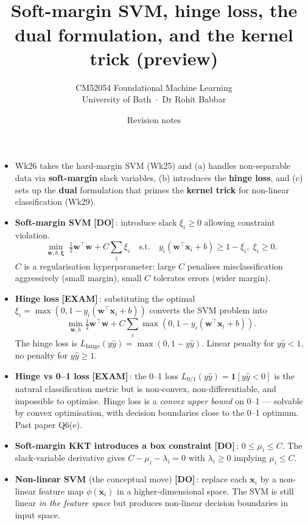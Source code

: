 \documentclass[11pt, a4paper]{article}
\title{\vspace{-1cm}{\Huge\bfseries Week 26 — Non-linear Support Vector Machines} \\[0.4em]{\large Soft-margin SVM, hinge loss, the dual formulation, and the kernel trick (preview)}}
\author{\large CM52054 Foundational Machine Learning \\[0.2em]\normalsize University of Bath \,$\cdot$\, Dr Rohit Babbar}
\date{Revision notes}
\newcommand{\examflag}{\textcolor{tipBd}{\textbf{[EXAM]}}\,}
\newcommand{\doflag}{\textcolor{defBd}{\textbf{[DO]}}\,}
\begin{document}
\maketitle\thispagestyle{empty}\vspace{1em}

\begin{tldrbox}
\begin{itemize}[leftmargin=*]
  \item Wk26 takes the hard-margin SVM (Wk25) and (a) handles non-separable data via \textbf{soft-margin} slack variables, (b) introduces the \textbf{hinge loss}, and (c) sets up the \textbf{dual} formulation that primes the \textbf{kernel trick} for non-linear classification (Wk29).
  \item \textbf{Soft-margin SVM} \doflag{}: introduce slack $\xi_i \ge 0$ allowing constraint violation.
  \[
  \min_{\mathbf{w}, b, \boldsymbol\xi}\;\tfrac{1}{2}\mathbf{w}^\top\mathbf{w} + C\sum_i \xi_i \quad\text{s.t.}\quad y_i(\mathbf{w}^\top\mathbf{x}_i + b) \ge 1 - \xi_i, \;\xi_i \ge 0.
  \]
  $C$ is a regularisation hyperparameter: large $C$ penalises misclassification aggressively (small margin), small $C$ tolerates errors (wider margin).
  \item \textbf{Hinge loss} \examflag{}: substituting the optimal $\xi_i = \max(0, 1 - y_i(\mathbf{w}^\top\mathbf{x}_i + b))$ converts the SVM problem into
  \[
  \min_{\mathbf{w}, b} \tfrac{1}{2}\mathbf{w}^\top\mathbf{w} + C\sum_i \max(0, 1 - y_i(\mathbf{w}^\top\mathbf{x}_i + b)).
  \]
  The hinge loss is $L_{\text{hinge}}(y\hat y) = \max(0, 1 - y\hat y)$. Linear penalty for $y\hat y < 1$, no penalty for $y\hat y \ge 1$.
  \item \textbf{Hinge vs 0--1 loss} \examflag{}: the 0--1 loss $L_{0/1}(y\hat y) = \mathbf{1}[y\hat y < 0]$ is the natural classification metric but is non-convex, non-differentiable, and impossible to optimise. Hinge loss is a \emph{convex upper bound} on 0--1 — solvable by convex optimisation, with decision boundaries close to the 0--1 optimum. Past paper Q6(e).
  \item \textbf{Soft-margin KKT introduces a box constraint} \doflag{}: $0 \le \mu_i \le C$. The slack-variable derivative gives $C - \mu_i - \lambda_i = 0$ with $\lambda_i \ge 0$ implying $\mu_i \le C$.
  \item \textbf{Non-linear SVM} (the conceptual move) \doflag{}: replace each $\mathbf{x}_i$ by a non-linear feature map $\phi(\mathbf{x}_i)$ in a higher-dimensional space. The SVM is still linear \emph{in the feature space} but produces non-linear decision boundaries in input space.

\end{itemize}
\end{tldrbox}
\end{document}
